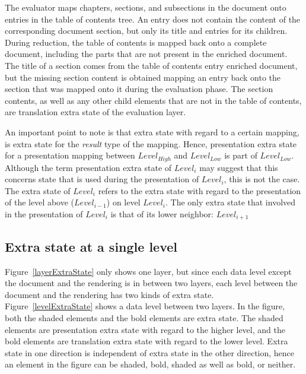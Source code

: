 The evaluator maps chapters, sections, and subsections in the document onto entries in the table of contents tree. An  entry does not contain the content of the corresponding document section, but only its title and entries for its children. During reduction, the table of contents is mapped back onto a complete document, including the parts that are not present in the enriched document. The title of a section comes from the table of contents entry enriched document, but the missing section content is obtained mapping an entry back onto the section that was mapped onto it during the evaluation phase. The section contents, as well as any other child elements that are not in the table of contents, are translation extra state of the evaluation layer.
 

An important point to note is that extra state with regard to a certain mapping, is extra state for the {\em result} type of the mapping. Hence, presentation extra state for a presentation mapping between $Level_{High}$ and $Level_{Low}$ is part of $Level_{Low}$. Although the term presentation extra state of $Level_i$ may suggest that this concerns state that is used during the presentation of $Level_i$, this is not the case. The extra state of $Level_i$ refers to the extra state with regard to the presentation of the level above ($Level_{i-1}$) on level $Level_i$. The only extra state that involved in the presentation of $Level_i$ is that of its lower neighbor: $Level_{i+1}$


%										
%										
\subsection{Extra state at a single level}

Figure~\ref{layerExtraState} only shows one layer, but since each data level except the document and the rendering is in between two layers, each level between the document and the rendering has two kinds of extra state. Figure~\ref{levelExtraState} shows a data level between two layers. In the figure, both the shaded elements and the bold elements are extra state. The shaded elements are presentation extra state with regard to the higher level, and the bold elements are translation extra state with regard to the lower level. Extra state in one direction is independent of extra state in the other direction, hence an element in the figure can be shaded, bold, shaded as well as bold, or neither. 

